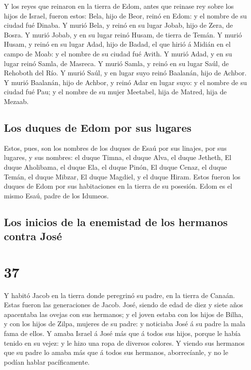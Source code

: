  Y los reyes que reinaron en la tierra de Edom, antes que
reinase rey sobre los hijos de Israel, fueron estos:  Bela,
hijo de Beor, reinó en Edom: y el nombre de su ciudad fué Dinaba.
 Y murió Bela, y reinó en su lugar Jobab, hijo de Zera, de
Bosra.  Y murió Jobab, y en su lugar reinó Husam, de tierra
de Temán.  Y murió Husam, y reinó en su lugar Adad, hijo de
Badad, el que hirió á Midián en el campo de Moab: y el nombre de su
ciudad fué Avith.  Y murió Adad, y en su lugar reinó Samla,
de Masreca.  Y murió Samla, y reinó en su lugar Saúl, de
Rehoboth del Río.  Y murió Saúl, y en lugar suyo reinó
Baalanán, hijo de Achbor.  Y murió Baalanán, hijo de
Achbor, y reinó Adar en lugar suyo: y el nombre de su ciudad fué Pau; y
el nombre de su mujer Meetabel, hija de Matred, hija de Mezaab.

\hypertarget{los-duques-de-edom-por-sus-lugares}{%
\subsection{Los duques de Edom por sus
lugares}\label{los-duques-de-edom-por-sus-lugares}}

 Estos, pues, son los nombres de los duques de Esaú por sus
linajes, por sus lugares, y sus nombres: el duque Timna, el duque Alva,
el duque Jetheth,  El duque Aholibama, el duque Ela, el
duque Pinón,  El duque Cenaz, el duque Temán, el duque
Mibzar,  El duque Magdiel, y el duque Hiram. Estos fueron
los duques de Edom por sus habitaciones en la tierra de su posesión.
Edom es el mismo Esaú, padre de los Idumeos.

\hypertarget{los-inicios-de-la-enemistad-de-los-hermanos-contra-josuxe9}{%
\subsection{Los inicios de la enemistad de los hermanos contra
José}\label{los-inicios-de-la-enemistad-de-los-hermanos-contra-josuxe9}}

\hypertarget{section-36}{%
\section{37}\label{section-36}}

 Y habitó Jacob en la tierra donde peregrinó su padre, en la
tierra de Canaán.  Estas fueron las generaciones de Jacob.
José, siendo de edad de diez y siete años apacentaba las ovejas con sus
hermanos; y el joven estaba con los hijos de Bilha, y con los hijos de
Zilpa, mujeres de su padre: y noticiaba José á su padre la mala fama de
ellos.  Y amaba Israel á José más que á todos sus hijos,
porque le había tenido en su vejez: y le hizo una ropa de diversos
colores.  Y viendo sus hermanos que su padre lo amaba más
que á todos sus hermanos, aborrecíanle, y no le podían hablar
pacíficamente.

